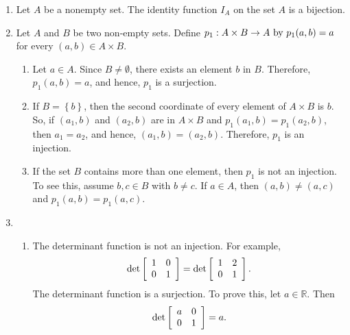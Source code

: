 \begin{enumerate}
\item Let $A$ be a nonempty set.  The identity function $I_A$ on the set $A$ is a bijection.

\item Let  $A$  and  $B$  be two non-empty sets.  Define  
$p_1 :A \times B \to A \text{ by }  \\
p_1 ( {a, b} ) = a$ for every  
$( {a, b} ) \in A \times B$.

\begin{enumerate}
\item Let $a \in A$.  Since $B \ne \emptyset$, there exists an element $b$ in $B$.  Therefore, 
$p_1 ( a, b ) = a$, and hence, $p_1$ is a surjection.

\item If $B = \left\{ b \right\}$, then the second coordinate of every element of $A \times B$ is $b$.  So, if $( a_1, b )$ and $( a_2, b )$ are in $A \times B$ and 
$p_1 ( {a_1, b} ) = p_1 ( {a_2, b} )$, then $a_1 = a_2$, and hence,
$( a_1, b ) = ( a_2, b )$.  Therefore, $p_1$ is an injection.

\item If the set $B$ contains more than one element, then $p_1$ is not an injection.  To see this, assume $b, c \in B$ with $b \ne c$.  If $a \in A$, then 
$( a, b ) \ne ( a, c )$ and 
$p_1 ( a, b ) = p_1 ( a, c )$.
\end{enumerate}

\item \begin{enumerate}
\item The determinant function is not an injection.  For example,
\[
\det \left[ {\begin{array}{*{20}c}
   1 & 0  \\
   0 & 1  \\
\end{array} } \right] =  \det \left[ {\begin{array}{*{20}c}
   1 & 2  \\
   0 & 1  \\
 \end{array} } \right].
\]
The determinant function is a surjection.  To prove this, let $a \in \mathbb{R}$.  Then
\[
\det \left[ {\begin{array}{*{20}c}
   a & 0  \\
   0 & 1  \\
\end{array} } \right] =  a.
\]


\end{enumerate}
\end{enumerate}
